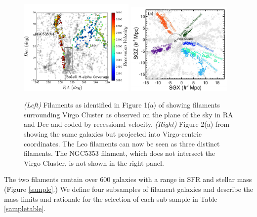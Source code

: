 \documentclass[11pt, preprint]{aastex}
\newcommand{\ha}{H$\alpha$}
\begin{document}
\begin{figure}[h]
\centering
\includegraphics[width=0.5\textwidth]{filaments.png}
\includegraphics[width=0.46\textwidth]{KimFig2a.png}
\caption{\small {\it (Left)} Filaments as identified in Figure 1(a) of \citet{kim16} showing filaments
  surrounding Virgo Cluster as observed on the plane of the sky in RA and Dec and coded by recessional velocity.  {\it (Right)} Figure 2(a) from \citet{kim16} showing the same galaxies but projected into
Virgo-centric coordinates.  The Leo filaments can now be seen as three
distinct filaments.  The NGC5353 filament, which does not intersect
the Virgo Cluster, is not shown in the right panel.}
\label{kimfigure}
\end{figure}



The two filaments contain over 600 galaxies with a range in SFR and stellar mass (Figure \ref{sample}.)
 We define four subsamples of filament galaxies and describe the mass limits and rationale for
the selection of each sub-sample in Table \ref{sampletable}.


\end{document}
